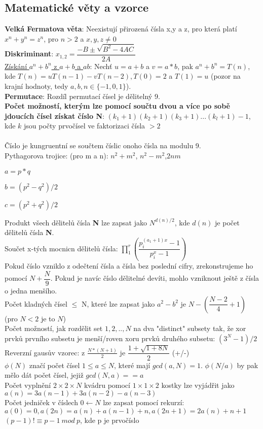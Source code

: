 \documentclass[11pt]{article}
\begin{document}
\subsection{Matematické věty a vzorce}
\textbf{Velká Fermatova věta}: Neexistují přirozená čísla x,y a z, pro která platí $x^n+y^n=z^n$, pro $n>2$ a $x,y,z \neq 0$
\\\textbf{Diskriminant}: $x_{1,2}=\dfrac{-B\pm\sqrt{B^2-4AC}}{2A}$
\\\underline{Získání $a^n+b^n$ z $a+b$ a $ab$}: Nechť $u=a+b$ a $v=a*b$, pak $a^n+b^n=T(n)$, kde $T(n)=uT(n-1)-vT(n-2), T(0)=2$ a $T(1)=u$ (pozor na krajní hodnoty, tedy $a,b,n \in \{-1,0,1\}$).
\\\textbf{Permutace}: Rozdíl permutací čísel je dělitelný 9.
\\\textbf{Počet možností, kterým lze pomocí součtu dvou a více po sobě jdoucích čísel získat číslo \textsf{N}}: $(k_1+1)(k_2+1)(k_3+1)...(k_l+1)-1$, kde $k$ jsou počty prvočísel ve faktorizaci čísla $> 2$
\\
\\Číslo je kungruentní se součtem číslic onoho čísla na modulu 9. 
\\Pythagorova trojice: (pro \textsf{m} a \textsf{n}): $n^2+m^2$, $n^2-m^2$,$2nm$
\begin{center}
$a=p*q$

$b=(p^2-q^2)/2$

$c=(p^2+q^2)/2$
\end{center}
Produkt všech dělitelů čísla \textbf{N} lze zapsat jako $N^{d(n)/2}$, kde $d(n)$ je počet dělitelů čísla \textbf{N}.
\\Součet x-tých mocnicn dělitelů čísla: $\prod_1^r(\dfrac{p_i^{(a_1+1)x}-1}{p_i^x-1})$
\\Pokud číslo vzniklo z odečtení čísla a čísla bez poslední cifry, zrekonstrujeme ho pomocí $N+\dfrac{N}{9}$. Pokud je navíc číslo dělitelné devíti, mohlo vzniknout ještě z čísla o jedna menšího.
\\Počet kladných čísel $\leq$ N, které lze zapsat jako $a^2-b^2$ je $N-(\dfrac{N-2}{4}+1)$ (pro $N<2$ je to $N$)
\\Počet možností, jak rozdělit set ${1,2,..,N}$ na dva "distinct" subsety tak, že xor prvků prvního subsetu je menší/roven xoru prvků druhého subsetu: $(3^N-1)/2$
\\Reverzní gausův vzorec: z $\frac{N*(N+1)}{2}$ je $\dfrac{1+\sqrt{1+8N}}{2}$ (+/-)
\\$\phi(N)$ značí počet čísel $1 \leq a \leq N$, které mají $gcd(a,N)=1$. $\phi(N/a)$ by pak mělo dát počet čísel, jejiž $gcd(N,a)==a$
\\Počet vyplnění $2\times 2 \times N$ kvádru pomocí $1\times 1 \times 2$ kostky lze vyjádřit jako $a(n)=3a(n-1)+3a(n-2)-a(n-3)$
\\Počet jedniček v číslech $0 \leftarrow N$ lze zapsat pomocí rekurzí: $a(0) = 0, a(2n) = a(n)+a(n-1)+n, a(2n+1) = 2a(n)+n+1$
\\$(p-1)!\equiv p-1\ mod\ p$, kde p je prvočíslo
\end{document}
